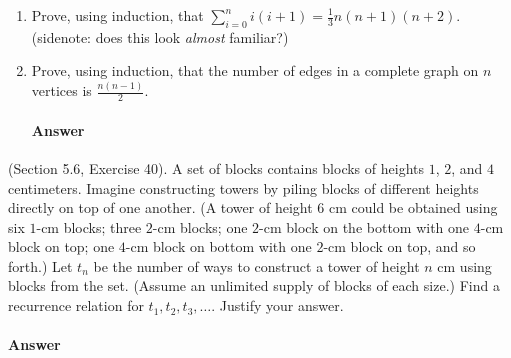 \begin{enumerate}

    \item Prove, using induction, that $\sum_{i=0}^n i (i+1) =
        \frac{1}{3}n(n+1)(n+2)$.  (sidenote: does this look \emph{almost}
        familiar?)

    \item Prove, using induction, that
        the number of edges in a complete graph on $n$ vertices is
        $\frac{n(n-1)}{2}$. %

        \paragraph{Answer}
        \todo{}



\end{enumerate}

\collab{\todo{}}

(Section 5.6, Exercise 40). A set of blocks contains blocks of heights $1$, $2$,
and $4$ centimeters.  Imagine constructing towers by piling blocks of different
heights directly on top of one another. (A tower of height $6$ cm could be
obtained using six $1$-cm blocks; three $2$-cm blocks; one $2$-cm block on the
bottom with one $4$-cm block on top; one $4$-cm block on bottom with one $2$-cm
block on top, and so forth.) Let $t_n$  be the number of ways to construct a
tower of height $n$ cm using blocks from the set. (Assume an unlimited supply of
blocks of each size.) Find a recurrence relation for $t_1, t_2, t_3, \ldots $.
Justify your answer.

\paragraph{Answer}
\todo{}

